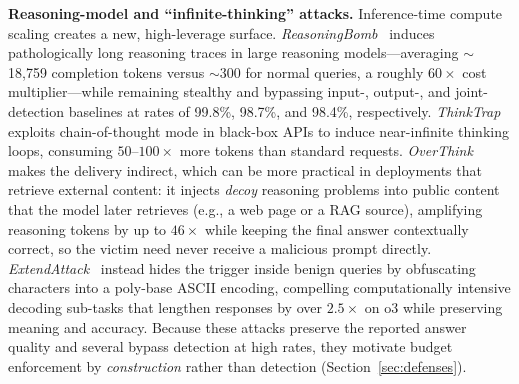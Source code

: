 \documentclass[acmsmall,screen,review,nonacm]{acmart}
\begin{document}
\noindent\textbf{Reasoning-model and ``infinite-thinking'' attacks.}
Inference-time compute scaling creates a new, high-leverage surface. \emph{ReasoningBomb}~\cite{liu2026reasoningbomb} induces pathologically long reasoning traces in large reasoning models---averaging $\sim$18{,}759 completion tokens versus $\sim$300 for normal queries, a roughly $60\times$ cost multiplier---while remaining stealthy and bypassing input-, output-, and joint-detection baselines at rates of 99.8\%, 98.7\%, and 98.4\%, respectively. \emph{ThinkTrap}~\cite{li2026thinktrap} exploits chain-of-thought mode in black-box APIs to induce near-infinite thinking loops, consuming $50$--$100\times$ more tokens than standard requests. \emph{OverThink}~\cite{kumar2025overthink} makes the delivery indirect, which can be more practical in deployments that retrieve external content: it injects \emph{decoy} reasoning problems into public content that the model later retrieves (e.g., a web page or a RAG source), amplifying reasoning tokens by up to $46\times$ while keeping the final answer contextually correct, so the victim need never receive a malicious prompt directly. \emph{ExtendAttack}~\cite{zhu2025extendattack} instead hides the trigger inside benign queries by obfuscating characters into a poly-base ASCII encoding, compelling computationally intensive decoding sub-tasks that lengthen responses by over $2.5\times$ on o3 while preserving meaning and accuracy. Because these attacks preserve the reported answer quality and several bypass detection at high rates, they motivate budget enforcement by \emph{construction} rather than detection (Section~\ref{sec:defenses}).
\end{document}

